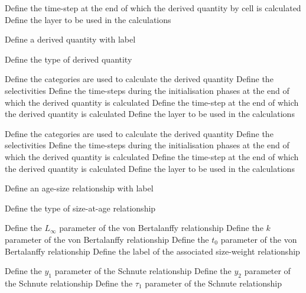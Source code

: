  {Define the time-step at the end of which the derived quantity by cell is calculated}
 {Define the layer to be used in the calculations}
\par{} {Define a derived quantity with label}\par
{} {Define the type of derived quantity}
\par\textbf{}\par
{} {Define the categories are used to calculate the derived quantity}
 {Define the selectivities}
 {Define the time-steps during the initialisation phases at the end of which the derived quantity is calculated}
 {Define the time-step at the end of which the derived quantity is calculated}
 {Define the layer to be used in the calculations}
\par\textbf{}\par
{} {Define the categories are used to calculate the derived quantity}
 {Define the selectivities}
 {Define the time-steps during the initialisation phases at the end of which the derived quantity is calculated}
 {Define the time-step at the end of which the derived quantity is calculated}
 {Define the layer to be used in the calculations}
\par{} {Define an age-size relationship with label}\par
{} {Define the type of size-at-age relationship}
\par\textbf{}\par
{} {Define the $L_\infty$ parameter of the von Bertalanffy relationship}
 {Define the $k$ parameter of the von Bertalanffy relationship}
 {Define the $t_0$ parameter of the von Bertalanffy relationship}
 {Define the label of the associated size-weight relationship}
\par\textbf{}\par
{} {Define the $y_1$ parameter of the Schnute relationship}
 {Define the $y_2$ parameter of the Schnute relationship}
 {Define the $\tau_1$ parameter of the Schnute relationship}
